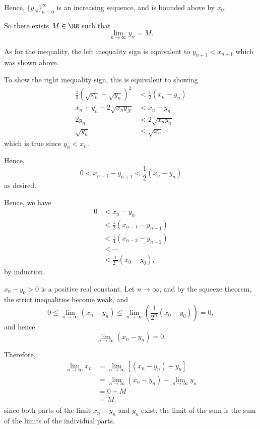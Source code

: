 \begin{enumerate}
          Hence, \(\{y_N\}_{n = 0}^\infty\) is an increasing sequence, and is bounded above by \(x_0\).

          So there exists \(M \in \RR\) such that
          \[
              \lim_{n \to \infty} y_n = M.
          \]

          As for the inequality, the left inequality sign is equivalent to \(y_{n + 1} < x_{n + 1}\) which was shown above.

          To show the right inequality sign, this is equivalent to showing
          \begin{align*}
              \frac{1}{2} (\sqrt{x_n} - \sqrt{y_n})^2 & < \frac{1}{2} (x_n - y_n) \\
              x_n + y_n - 2 \sqrt{x_n y_N}            & < x_n - y_n               \\
              2 y_n                                   & < 2 \sqrt{x_n y_n}        \\
              \sqrt{y_n}                              & < \sqrt{x_n},
          \end{align*}
          which is true since \(y_n < x_n\).

          Hence,
          \[
              0 < x_{n + 1} - y_{n + 1} < \frac{1}{2} (x_n - y_n)
          \]
          as desired.

          Hence, we have
          \begin{align*}
              0 & < x_n - y_n                           \\
                & < \frac{1}{2} (x_{n - 1} - y_{n - 1}) \\
                & < \frac{1}{4} (x_{n - 2} - y_{n - 2}) \\
                & < \cdots                              \\
                & < \frac{1}{2^n} (x_0 - y_0),
          \end{align*}
          by induction.

          \(x_0 - y_0 > 0\) is a positive real constant. Let \(n \to \infty\), and by the squeeze theorem, the strict inequalities become weak, and
          \[
              0 \leq \lim_{n \to \infty} (x_n - y_n) \leq \lim_{n \to \infty} \left(\frac{1}{2^n} (x_0 - y_0)\right) = 0,
          \]
          and hence
          \[
              \lim_{n \to \infty} (x_n - y_n) = 0.
          \]

          Therefore,
          \begin{align*}
              \lim_{n \to \infty} x_n & = \lim_{n \to \infty} \left[(x_n - y_n) + y_n\right]        \\
                                      & = \lim_{n \to \infty} (x_n - y_n) + \lim_{n \to \infty} y_n \\
                                      & = 0 + M                                                     \\
                                      & = M,
          \end{align*}
          since both parts of the limit \(x_n - y_n\) and \(y_n\) exist, the limit of the sum is the sum of the limits of the individual parts.


\end{enumerate}

